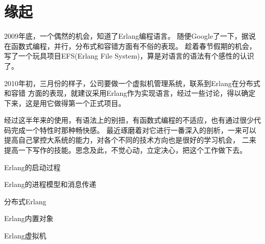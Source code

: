 \chapter{缘起}

2009年底，一个偶然的机会，知道了Erlang编程语言。
随便Google了一下，据说在函数式编程，并行，分布式和容错方面有不俗的表现。
趁着春节假期的机会，写了一个玩具项目EFS(Erlang File System)，算是对语言的语法有个感性的认识了。

2010年初，三月份的样子，公司要做一个虚拟机管理系统，联系到Erlang在分布式和容错
方面的表现，就建议采用Erlang作为实现语言，经过一些讨论，得以确定下来，这是用它做得第一个正式项目。

经过这半年来的使用，有语法上的别扭，有函数式编程的不适应，也有通过很少代码完成一个特性时那种畅快感。
最近琢磨着对它进行一番深入的剖析，一来可以提高自己掌控大系统的能力，对各个不同的技术方向也是很好的学习机会，
二来提高一下写作的技能。思念及此，不觉心动，立定决心，把这个工作做下去。

Erlang的启动过程

Erlang的进程模型和消息传递

分布式Erlang

Erlang内置对象

Erlang虚拟机


